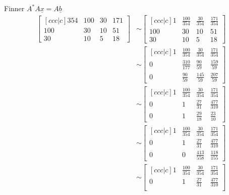 \documentclass[11pt, a4paper, norsk]{NTNUoving}
\begin{document}
\begin{oppgave}
\begin{punkt}
           Finner $A^{*}A\underline{x} = A\underline{b}$
           \begin{align*}
               \begin{bmatrix}[ccc|c]
                   354 & 100 & 30 & 171 \\
                   100 & 30 & 10 & 51 \\
                   30 & 10 & 5 & 18
               \end{bmatrix} &\sim \begin{bmatrix}[ccc|c]
               1 & \frac{100}{354} & \frac{30}{354} & \frac{171}{354} \\
               100 & 30 & 10 & 51 \\
               30 & 10 & 5 & 18
               \end{bmatrix}
               \\
               &\sim \begin{bmatrix}[ccc|c]
                   1 & \frac{100}{354} & \frac{30}{354} & \frac{171}{354} \\
                   0 & \frac{310}{177} & \frac{90}{59} & \frac{159}{59} \\
                   0 & \frac{90}{59} & \frac{145}{59} & \frac{207}{59}
               \end{bmatrix}
               \\
               &\sim \begin{bmatrix}[ccc|c]
                   1 & \frac{100}{354} & \frac{30}{354} & \frac{171}{354} \\
                   0 & 1 & \frac{27}{31} & \frac{477}{310} \\
                   0 & 1 & \frac{29}{18} & \frac{23}{10} 
               \end{bmatrix}
               \\
                &\sim \begin{bmatrix}[ccc|c]
                    1 & \frac{100}{354} & \frac{30}{354} & \frac{171}{354} \\
                    0 & 1 & \frac{27}{31} & \frac{477}{310} \\
                    0 & 0 & \frac{413}{558} & \frac{118}{155} 
               \end{bmatrix}
                \\
                &\sim \begin{bmatrix}[ccc|c]
                    1 & \frac{100}{354} & \frac{30}{354} & \frac{171}{354} \\
                    0 & 1 & \frac{27}{31} & \frac{477}{310} \\

\end{bmatrix}
\end{align*}
\end{punkt}
\end{oppgave}
\end{document}
